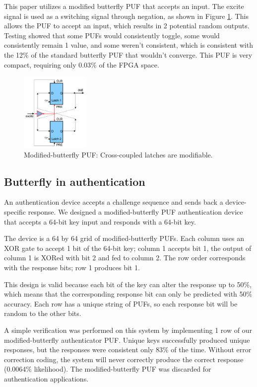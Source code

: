 	This paper utilizes a modified butterfly PUF that accepts an input. The excite signal is used as a switching signal through negation, as shown in Figure \ref{fig:bfly2}. This allows the PUF to accept an input, which results in 2 potential random outputs. Testing showed that some PUFs would consistently toggle, some would consistently remain 1 value, and some weren't consistent, which is consistent with the 12\% of the standard butterfly PUF that wouldn't converge. This PUF is very compact, requiring only 0.03\% of the FPGA space. 
		\begin{figure}[tbph]
			\centering
			\includegraphics[width=0.3\textwidth]{bfly2.png}
			\caption{Modified-butterfly PUF: Cross-coupled latches are modifiable.}\label{fig:bfly2}
		\end{figure}
		

	\subsection{Butterfly in authentication}
		An authentication device accepts a challenge sequence and sends back a device-specific response. We designed a modified-butterfly PUF authentication device that accepts a 64-bit key input and responds with a 64-bit key. 

		The device is a 64 by 64 grid of modified-butterfly PUFs. Each column uses an XOR gate to accept 1 bit of the 64-bit key; column 1 accepts bit 1, the output of column 1 is XORed with bit 2 and fed to column 2. The row order corresponds with the response bits; row 1 produces bit 1. 

		This design is valid because each bit of the key can alter the response up to 50\%, which means that the corresponding response bit can only be predicted with 50\% accuracy. Each row has a unique string of PUFs, so each response bit will be random to the other bits. 

		A simple verification was performed on this system by implementing 1 row of our modified-butterfly authenticator PUF. Unique keys successfully produced unique responses, but the responses were consistent only 83\% of the time. Without error correction coding, the system will never correctly produce the correct response (0.0064\% likelihood). The modified-butterfly PUF was discarded for authentication applications. 

